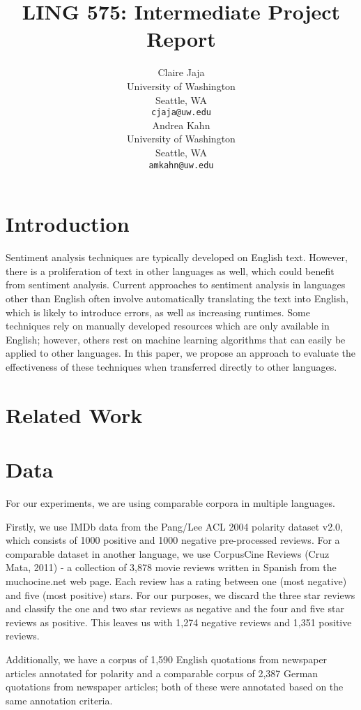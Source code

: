 \documentclass[11pt]{article}
\title{LING 575: Intermediate Project Report}
\author{Claire Jaja \\
  University of Washington \\
  Seattle, WA \\
  {\tt cjaja@uw.edu} \\\And
  Andrea Kahn \\
  University of Washington \\
  Seattle, WA \\
  {\tt amkahn@uw.edu} \\}
\date{}
\begin{document}
\maketitle
\begin{abstract}
\end{abstract}

\section{Introduction}

Sentiment analysis techniques are typically developed on English text.  However, there is a proliferation of text in other languages as well, which could benefit from sentiment analysis.  Current approaches to sentiment analysis in languages other than English often involve automatically translating the text into English, which is likely to introduce errors, as well as increasing runtimes.  Some techniques rely on manually developed resources which are only available in English; however, others rest on machine learning algorithms that can easily be applied to other languages.  In this paper, we propose an approach to evaluate the effectiveness of these techniques when transferred directly to other languages.

\section{Related Work}


\section{Data}

For our experiments, we are using comparable corpora in multiple languages.

Firstly, we use IMDb data from the Pang/Lee ACL 2004 polarity dataset v2.0, which consists of 1000 positive and 1000 negative pre-processed reviews.  For a comparable dataset in another language, we use CorpusCine Reviews (Cruz Mata, 2011) - a collection of 3,878 movie reviews written in Spanish from the muchocine.net web page.  Each review has a rating between one (most negative) and five (most positive) stars.  For our purposes, we discard the three star reviews and classify the one and two star reviews as negative and the four and five star reviews as positive.  This leaves us with 1,274 negative reviews and 1,351 positive reviews.

Additionally, we have a corpus of 1,590 English quotations from newspaper articles annotated for polarity and a comparable corpus of 2,387 German quotations from newspaper articles; both of these were annotated based on the same annotation criteria.
\end{document}
